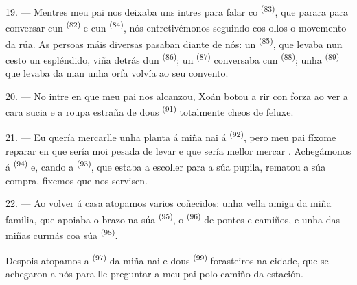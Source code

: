 19. --- Mentres meu pai nos deixaba uns intres para falar co  \textsuperscript{(83)}, que parara para conversar cun 
\textsuperscript{(82)} e cun  \textsuperscript{(84)}, nós
entretivémonos seguindo cos ollos o movemento da rúa. As persoas máis diversas
pasaban diante de nós: un  \textsuperscript{(85)}, que
levaba nun cesto un  espléndido, viña detrás dun  \textsuperscript{(86)}; un 
\textsuperscript{(87)} conversaba cun  \textsuperscript{(88)}; unha
 \textsuperscript{(89)} que levaba da man unha orfa volvía ao seu
convento.

\VUsaut{3.0mm}

20. --- No intre en que meu pai nos alcanzou, Xoán botou a rir con forza ao ver a cara
sucia e a roupa estraña de dous 
\textsuperscript{(91)} totalmente cheos de feluxe.

21. --- Eu quería mercarlle unha planta á miña nai á 
\textsuperscript{(92)}, pero meu pai fíxome reparar en que sería moi pesada de levar e
que sería mellor mercar . Achegámonos á 
\textsuperscript{(94)} e, cando a  \textsuperscript{(93)}, que
estaba a escoller para a súa pupila, rematou a súa compra, fixemos que nos servisen.

22. --- Ao volver á casa atopamos varios coñecidos: unha vella amiga da miña familia,
que apoiaba o brazo na súa  \textsuperscript{(95)}, o
 \textsuperscript{(96)} de pontes e camiños, e unha das miñas
curmás coa súa  \textsuperscript{(98)}.

Despois atopamos a  \textsuperscript{(97)} da miña nai e dous
 \textsuperscript{(99)} forasteiros na cidade, que se achegaron a nós
para lle preguntar a meu pai polo camiño da estación.
